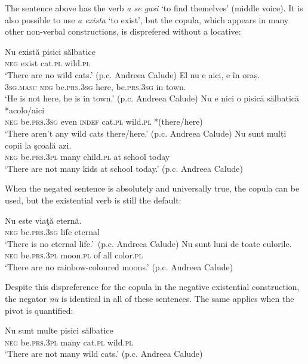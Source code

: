 ﻿\documentclass[output=paper]{langsci/langscibook}
\begin{document}
\begin{unindented}
The sentence above has the verb \textit{a se gasi} `to find themelves' (middle voice). It is also possible to use \textit{a exista} `to exist', but the copula, which appears in many other non-verbal constructions, is disprefered without a locative:
%
\begin{exe}\ex \gll Nu există pisici sălbatice \\
\textsc{neg} exist cat.\textsc{pl} wild.\textsc{pl} \\
    \glt `There are no wild cats.' (p.c. Andreea Calude)
\ex \gll El nu e aici, e în oraș.  \\
\textsc{3sg.masc} \textsc{neg} be.\textsc{prs}.\textsc{3sg} here,          be.\textsc{prs.3sg} in town.  \\
    \glt `He is not here, he is in town.' (p.c. Andreea Calude)
\ex \gll Nu e nici o pisică sălbatică *{\op}acolo/aici{\cp} \\
\textsc{neg} be.\textsc{prs}.\textsc{3sg} even \textsc{indef} cat.\textsc{pl}  wild.\textsc{pl} *(there/here) \\
    \glt `There aren't any wild cats there/here.' (p.c. Andreea Calude)
\ex \gll Nu sunt mulți copii la şcoală azi.  \\
\textsc{neg} be.\textsc{prs.3pl} many child.\textsc{pl} at school today \\
    \glt `There are not many kids at school today.' (p.c. Andreea Calude)
    \end{exe}

When the negated sentence is absolutely and universally true, the copula can be used, but the existential verb is still the default:
%
\begin{exe}\ex \gll Nu este viaţă eternă.  \\
\textsc{neg} be.\textsc{prs.3sg} life eternal \\
    \glt `There is no eternal life.'~(p.c. Andreea Calude)
\ex \gll Nu sunt luni de toate culorile.  \\
\textsc{neg} be.\textsc{prs.3pl} moon.\textsc{pl} of all color.\textsc{pl} \\
    \glt `There are no rainbow-coloured moons.' (p.c. Andreea Calude)
    \end{exe}

Despite this dispreference for the copula in the negative existential construction, the negator \textit{nu} is identical in all of these sentences. The same applies when the pivot is quantified:
%
\begin{exe}\ex \gll Nu sunt multe pisici sălbatice \\
\textsc{neg} be.\textsc{prs.3pl} many cat.\textsc{pl} wild.\textsc{pl} \\
    \glt `There are not many wild cats.' (p.c. Andreea Calude)
    \end{exe}


\end{unindented}
\end{document}
